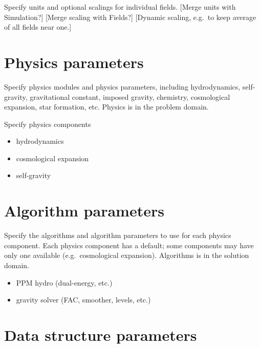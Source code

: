 \documentclass{book}
\begin{document}
 Specify units and optional scalings for individual
 fields.  [Merge units with Simulation?] [Merge scaling with Fields?] 
 [Dynamic scaling, e.g.~to keep average of all fields near one.]

\section{Physics parameters} \label{s:physics}

Specify physics modules and physics parameters, including
hydrodynamics, self-gravity, gravitational constant, imposed gravity,
chemistry, cosmological expansion, star formation, etc.  Physics is in
the problem domain.

Specify physics components

\begin{itemize}
\item hydrodynamics
\item  cosmological expansion
\item self-gravity
\end{itemize}
\section{Algorithm parameters} \label{s:algorithm}

 Specify the algorithms and algorithm parameters
 to use for each physics component.  Each physics component has a
 default; some components may have only one available
 (e.g.~cosmological expansion).  Algorithms is in the solution domain.

\begin{itemize}
\item PPM hydro (dual-energy, etc.)
\item gravity solver (FAC, smoother, levels, etc.)
\end{itemize}
\section{Data structure parameters} \label{s:data}
\end{document}
